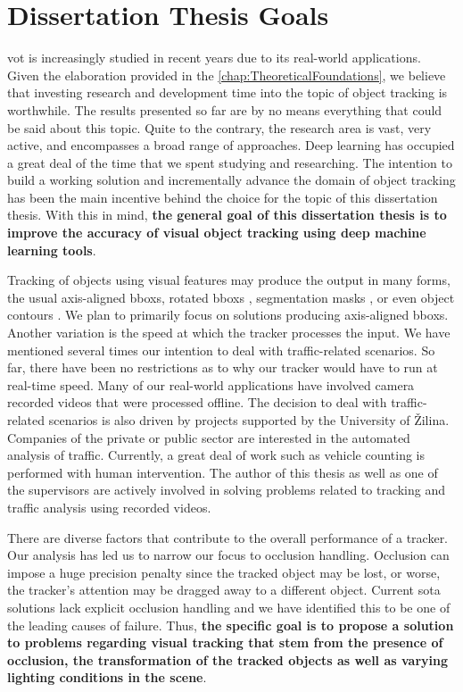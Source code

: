 \chapter{Dissertation Thesis Goals}
\label{chap:Goals}

\Gls{vot} is increasingly studied in recent years due to its real-world applications. Given the elaboration provided in the \cref{chap:TheoreticalFoundations}, we believe that investing research and development time into the topic of object tracking is worthwhile. The results presented so far are by no means everything that could be said about this topic. Quite to the contrary, the research area is vast, very active, and encompasses a broad range of approaches. Deep learning has occupied a great deal of the time that we spent studying and researching. The intention to build a working solution and incrementally advance the domain of object tracking has been the main incentive behind the choice for the topic of this dissertation thesis. With this in mind, \textbf{the general goal of this dissertation thesis is to improve the accuracy of visual object tracking using deep machine learning tools}.

Tracking of objects using visual features may produce the output in many forms, the usual axis-aligned \glspl{bbox}, rotated \glspl{bbox} \cite{Chen2019}, segmentation masks \cite{Wang2019}, or even object contours \cite{Yang2016}. We plan to primarily focus on solutions producing axis-aligned \glspl{bbox}. Another variation is the speed at which the tracker processes the input. We have mentioned several times our intention to deal with traffic-related scenarios. So far, there have been no restrictions as to why our tracker would have to run at real-time speed. Many of our real-world applications have involved camera recorded videos that were processed offline. The decision to deal with traffic-related scenarios is also driven by projects supported by the University of Žilina. Companies of the private or public sector are interested in the automated analysis of traffic. Currently, a great deal of work such as vehicle counting is performed with human intervention. The author of this thesis as well as one of the supervisors are actively involved in solving problems related to tracking and traffic analysis using recorded videos.

There are diverse factors that contribute to the overall performance of a tracker. Our analysis has led us to narrow our focus to occlusion handling. Occlusion can impose a huge precision penalty since the tracked object may be lost, or worse, the tracker's attention may be dragged away to a different object. Current \gls{sota} solutions lack explicit occlusion handling \cite{Guo2019, Li2018, Wang2019} and we have identified this to be one of the leading causes of failure. Thus, \textbf{the specific goal is to propose a solution to problems regarding visual tracking that stem from the presence of occlusion, the transformation of the tracked objects as well as varying lighting conditions in the scene}.

